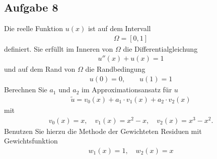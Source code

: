 \documentclass[
	final,
	a4paper,
	oneside,
	parskip=full,
	headings=standardclasses,
	headings=big,
	pointednumbers
]{scrartcl}
\begin{document}
    \subsection*{Aufgabe 8}
    Die reelle Funktion $u{\left(x\right)}$ ist auf dem Intervall
    \begin{align*}
        \Omega = \left[ 0, 1 \right]
    \end{align*}
    definiert. Sie erfüllt im Inneren von $\Omega$ die Differentialgleichung
    \begin{align*}
        u''{\left(x\right)} + u{\left(x\right)} = 1
    \end{align*}
    und auf dem Rand von $\Omega$ die Randbedingung
    \begin{align*}
        u{\left( 0 \right)} = 0, \qquad u{\left( 1 \right)} = 1
    \end{align*}
    Berechnen Sie $a_1$ und $a_2$ im Approximationsansatz für $u$
    \begin{align*}
        \tilde{u} = v_0{\left(x\right)} + a_1 \cdot v_1{\left(x\right)} + a_2 \cdot v_2{\left(x\right)}
    \end{align*}
    mit
    \begin{align*}
        v_0{\left(x\right)} = x, \quad v_1{\left(x\right)} = x^2 - x, \quad v_2{\left(x\right)} = x^3 - x^2.
    \end{align*}
    Benutzen Sie hierzu die Methode der Gewichteten Residuen mit Gewichtsfunktion
    \begin{align*}
        w_1{\left(x\right)} = 1, \quad w_2{\left(x\right)} = x
    \end{align*}
\end{document}
